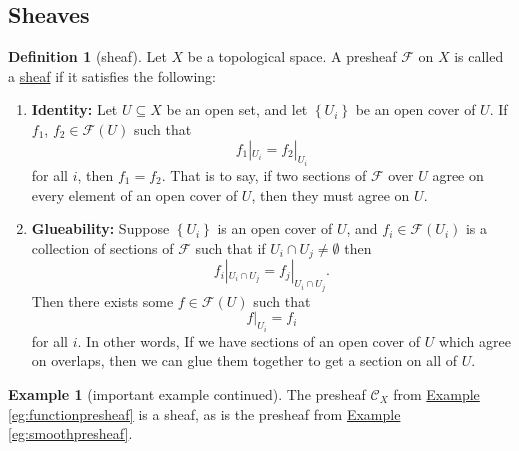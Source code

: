 \documentclass[a4paper]{report}
\newcommand{\defn}[1]{\ul{#1}}
\theoremstyle{definition}
\newtheorem{definition}{Definition}[section]
\newtheorem{example}{Example}[section]
\theoremstyle{plain}
\theoremstyle{remark}
\begin{document}
\subsection{Sheaves}
\begin{definition}[sheaf]
  \label{def:sheaf}
  Let $X$ be a topological space. A presheaf $\mathcal{F}$ on $X$ is called a \defn{sheaf} if it satisfies the following:
  \begin{enumerate}
    \item \textbf{Identity:} Let $U \subseteq X$ be an open set, and let $\left\{ U_{i} \right\}$ be an open cover of $U$. If $f_{1}$, $f_{2} \in \mathcal{F}(U)$ such that
      \begin{equation*}
        f_{1}|_{U_{i}} = f_{2}|_{U_{i}}
      \end{equation*}
      for all $i$, then $f_{1} = f_{2}$. That is to say, if two sections of $\mathcal{F}$ over $U$ agree on every element of an open cover of $U$, then they must agree on $U$.

    \item \textbf{Glueability:} Suppose $\left\{ U_{i} \right\}$ is an open cover of $U$, and $f_{i} \in \mathcal{F}(U_{i})$ is a collection of sections of $\mathcal{F}$ such that if $U_{i} \cap U_{j} \neq \emptyset$ then
      \begin{equation*}
        f_{i}|_{U_{i} \cap U_{j}} = f_{j}|_{U_{i} \cap U_{j}}.
      \end{equation*}
      Then there exists some $f \in \mathcal{F}(U)$ such that 
      \begin{equation*}
        f|_{U_{i}} = f_{i}
      \end{equation*}
      for all $i$. In other words, If we have sections of an open cover of $U$ which agree on overlaps, then we can glue them together to get a section on all of $U$.
  \end{enumerate}
\end{definition}

\begin{example}[important example continued]
  \label{eg:functionsheaf}
  The presheaf $\mathcal{C}_{X}$ from \hyperref[eg:functionpresheaf]{Example \ref*{eg:functionpresheaf}} is a sheaf, as is the presheaf from \hyperref[eg:smoothpresheaf]{Example \ref*{eg:smoothpresheaf}}.
\end{example}
\end{document}

